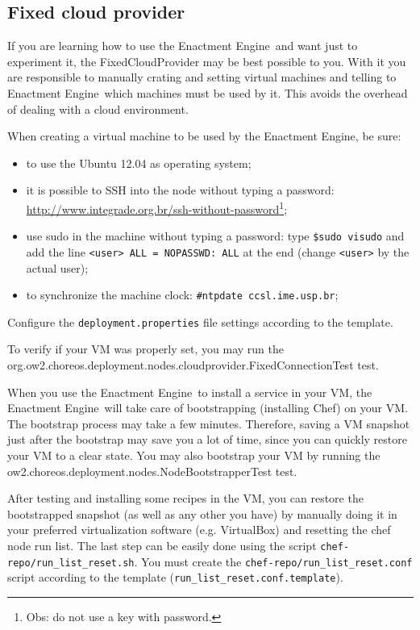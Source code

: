 \documentclass[a4paper, 10pt]{article}
\newcommand{\ee}{Enactment Engine}
\begin{document}
\subsection{Fixed cloud provider}

If you are learning how to use the \ee\ and want just to experiment it, the \textsf{FixedCloudProvider} may be best possible to you. With it you are responsible to manually crating and setting virtual machines and telling to \ee\ which machines must be used by it. This avoids the overhead of dealing with a cloud environment. 

When creating a virtual machine to be used by the \ee, be sure:
\begin{itemize}
\item to use the Ubuntu 12.04 as operating system;
\item it is possible to SSH into the node without typing a password: \url{http://www.integrade.org.br/ssh-without-password}\footnote{Obs: do not use a key with password.};
\item use sudo in the machine without typing a password: type \texttt{\$sudo visudo} and add the line \texttt{<user> ALL = NOPASSWD: ALL} at the end (change \texttt{<user>} by the actual user);
\item to synchronize the machine clock: \texttt{\#ntpdate ccsl.ime.usp.br};
\end{itemize}

Configure the \texttt{deployment.properties} file settings according to the template.

To verify if your VM was properly set, you may run the \\ \textsf{org.ow2.choreos.deployment.nodes.cloudprovider.FixedConnectionTest} test.

When you use the \ee\ to install a service in your VM, the \ee\ will take care of bootstrapping (installing Chef) on your VM. The bootstrap process may take a few minutes. Therefore, saving a VM snapshot just after the bootstrap may save you a lot of time, since you can quickly restore your VM to a clear state. You may also bootstrap your VM by running the \textsf{ow2.choreos.deployment.nodes.NodeBootstrapperTest} test.

After testing and installing some recipes in the VM, you can restore the bootstrapped snapshot (as well as any other you have) by manually doing it in your preferred virtualization software (e.g. VirtualBox) and resetting the chef node run list. The last step can be easily done using the script \texttt{chef-repo/run\_list\_reset.sh}. You must create the \texttt{chef-repo/run\_list\_reset.conf} script according to the template (\texttt{run\_list\_reset.conf.template}).
\end{document}

